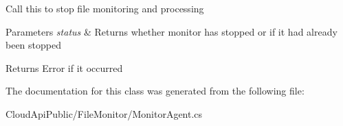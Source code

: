 Call this to stop file monitoring and processing 


\begin{DoxyParams}{Parameters}
{\em status} & Returns whether monitor has stopped or if it had already been stopped\\
\hline
\end{DoxyParams}
\begin{DoxyReturn}{Returns}
Error if it occurred
\end{DoxyReturn}


The documentation for this class was generated from the following file\-:\begin{DoxyCompactItemize}
\item 
Cloud\-Api\-Public/\-File\-Monitor/Monitor\-Agent.\-cs\end{DoxyCompactItemize}
